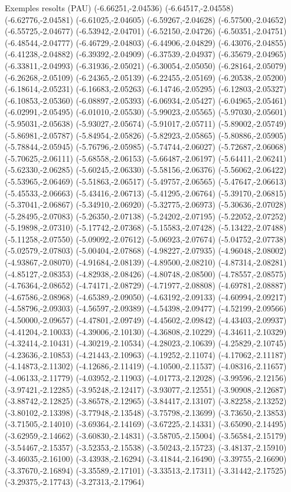 \documentclass[11pt,a4paper]{article}
\begin{document}
\begin{fmex}{Exemples resolts (PAU)}
(-6.66251,-2.04536) (-6.64517,-2.04558) (-6.62776,-2.04581) (-6.61025,-2.04605) (-6.59267,-2.04628) (-6.57500,-2.04652) (-6.55725,-2.04677) (-6.53942,-2.04701) (-6.52150,-2.04726) (-6.50351,-2.04751) (-6.48544,-2.04777) (-6.46729,-2.04803) (-6.44906,-2.04829) (-6.43076,-2.04855) (-6.41238,-2.04882) (-6.39392,-2.04909) (-6.37539,-2.04937) (-6.35679,-2.04965) (-6.33811,-2.04993) (-6.31936,-2.05021) (-6.30054,-2.05050) (-6.28164,-2.05079) (-6.26268,-2.05109) (-6.24365,-2.05139) (-6.22455,-2.05169) (-6.20538,-2.05200) (-6.18614,-2.05231) (-6.16683,-2.05263) (-6.14746,-2.05295) (-6.12803,-2.05327) (-6.10853,-2.05360) (-6.08897,-2.05393) (-6.06934,-2.05427) (-6.04965,-2.05461) (-6.02991,-2.05495) (-6.01010,-2.05530) (-5.99023,-2.05565) (-5.97030,-2.05601) (-5.95031,-2.05638) (-5.93027,-2.05674) (-5.91017,-2.05711) (-5.89002,-2.05749) (-5.86981,-2.05787) (-5.84954,-2.05826) (-5.82923,-2.05865) (-5.80886,-2.05905) (-5.78844,-2.05945) (-5.76796,-2.05985) (-5.74744,-2.06027) (-5.72687,-2.06068) (-5.70625,-2.06111) (-5.68558,-2.06153) (-5.66487,-2.06197) (-5.64411,-2.06241) (-5.62330,-2.06285) (-5.60245,-2.06330) (-5.58156,-2.06376) (-5.56062,-2.06422) (-5.53965,-2.06469) (-5.51863,-2.06517) (-5.49757,-2.06565) (-5.47647,-2.06613) (-5.45533,-2.06663) (-5.43416,-2.06713) (-5.41295,-2.06764) (-5.39170,-2.06815) (-5.37041,-2.06867) (-5.34910,-2.06920) (-5.32775,-2.06973) (-5.30636,-2.07028) (-5.28495,-2.07083) (-5.26350,-2.07138) (-5.24202,-2.07195) (-5.22052,-2.07252) (-5.19898,-2.07310) (-5.17742,-2.07368) (-5.15583,-2.07428) (-5.13422,-2.07488) (-5.11258,-2.07550) (-5.09092,-2.07612) (-5.06923,-2.07674) (-5.04752,-2.07738) (-5.02579,-2.07803) (-5.00404,-2.07868) (-4.98227,-2.07935) (-4.96048,-2.08002) (-4.93867,-2.08070) (-4.91684,-2.08139) (-4.89500,-2.08210) (-4.87314,-2.08281) (-4.85127,-2.08353) (-4.82938,-2.08426) (-4.80748,-2.08500) (-4.78557,-2.08575) (-4.76364,-2.08652) (-4.74171,-2.08729) (-4.71977,-2.08808) (-4.69781,-2.08887) (-4.67586,-2.08968) (-4.65389,-2.09050) (-4.63192,-2.09133) (-4.60994,-2.09217) (-4.58796,-2.09303) (-4.56597,-2.09389) (-4.54398,-2.09477) (-4.52199,-2.09566) (-4.50000,-2.09657) (-4.47801,-2.09749) (-4.45602,-2.09842) (-4.43403,-2.09937) (-4.41204,-2.10033) (-4.39006,-2.10130) (-4.36808,-2.10229) (-4.34611,-2.10329) (-4.32414,-2.10431) (-4.30219,-2.10534) (-4.28023,-2.10639) (-4.25829,-2.10745) (-4.23636,-2.10853) (-4.21443,-2.10963) (-4.19252,-2.11074) (-4.17062,-2.11187) (-4.14873,-2.11302) (-4.12686,-2.11419) (-4.10500,-2.11537) (-4.08316,-2.11657) (-4.06133,-2.11779) (-4.03952,-2.11903) (-4.01773,-2.12028) (-3.99596,-2.12156) (-3.97421,-2.12285) (-3.95248,-2.12417) (-3.93077,-2.12551) (-3.90908,-2.12687) (-3.88742,-2.12825) (-3.86578,-2.12965) (-3.84417,-2.13107) (-3.82258,-2.13252) (-3.80102,-2.13398) (-3.77948,-2.13548) (-3.75798,-2.13699) (-3.73650,-2.13853) (-3.71505,-2.14010) (-3.69364,-2.14169) (-3.67225,-2.14331) (-3.65090,-2.14495) (-3.62959,-2.14662) (-3.60830,-2.14831) (-3.58705,-2.15004) (-3.56584,-2.15179) (-3.54467,-2.15357) (-3.52353,-2.15538) (-3.50243,-2.15723) (-3.48137,-2.15910) (-3.46035,-2.16100) (-3.43938,-2.16294) (-3.41844,-2.16490) (-3.39755,-2.16690) (-3.37670,-2.16894) (-3.35589,-2.17101) (-3.33513,-2.17311) (-3.31442,-2.17525) (-3.29375,-2.17743) (-3.27313,-2.17964) 
\end{fmex}
\end{document}
